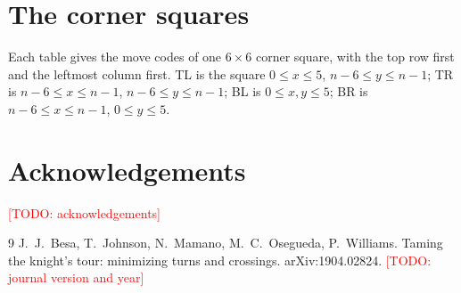 \documentclass[11pt]{article}
\theoremstyle{definition}
\theoremstyle{remark}
\newcommand{\todo}[1]{\textcolor{red}{[TODO: #1]}}
\begin{document}
\section{The corner squares}\label{app:corners}

Each table gives the move codes of one $6\times6$ corner square, with the top row first and the leftmost column first.
TL is the square $0\le x\le5$, $n-6\le y\le n-1$; TR is $n-6\le x\le n-1$, $n-6\le y\le n-1$; BL is $0\le x,y\le5$; BR is $n-6\le x\le n-1$, $0\le y\le5$.



\section*{Acknowledgements}
\todo{acknowledgements}

\begin{thebibliography}{9}
 J.~J.~Besa, T.~Johnson, N.~Mamano, M.~C.~Osegueda, P.~Williams.
\newblock Taming the knight's tour: minimizing turns and crossings.
\newblock arXiv:1904.02824. \todo{journal version and year}
\end{thebibliography}
\end{document}
